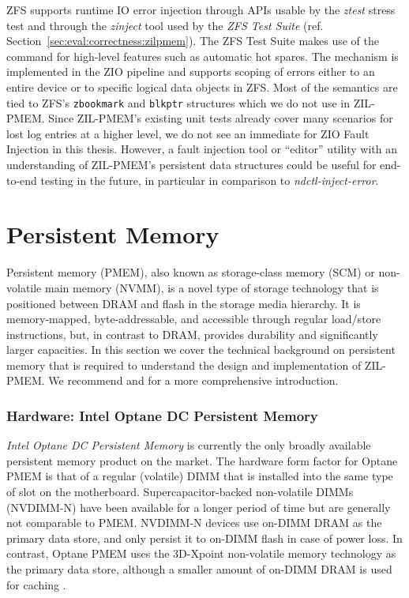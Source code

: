 \documentclass[12pt,a4paper,twoside]{book}
\begin{document}
ZFS supports runtime IO error injection through APIs usable by the \textit{ztest} stress test and through the \textit{zinject} tool used by the \textit{ZFS Test Suite} (ref. Section~\ref{sec:eval:correctness:zilpmem}).
The ZFS Test Suite makes use of the command for high-level features such as automatic hot spares.
The mechanism is implemented in the ZIO pipeline and supports scoping of errors either to an entire device or to specific logical data objects in ZFS.
Most of the semantics are tied to ZFS’s \lstinline{zbookmark} and \lstinline{blkptr} structures which we do not use in ZIL-PMEM.
Since ZIL-PMEM's existing unit tests already cover many scenarios for lost log entries at a higher level, we do not see an immediate for ZIO Fault Injection in this thesis.
However, a fault injection tool or ``editor'' utility with an understanding of ZIL-PMEM's persistent data structures could be useful for end-to-end testing in the future, in particular in comparison to \textit{ndctl-inject-error}.

\section{Persistent Memory}
Persistent memory (PMEM), also known as storage-class memory (SCM) or non-volatile main memory (NVMM), is a novel type of storage technology that is positioned between DRAM and flash in the storage media hierarchy.
It is memory-mapped, byte-addressable, and accessible through regular load/store instructions, but, in contrast to DRAM, provides durability and significantly larger capacities.
In this section we cover the technical background on persistent memory that is required to understand the design and implementation of ZIL-PMEM.
We recommend \cite{rudoffPersistentMemoryProgramming2017} and \cite{Scargall2020} for a more comprehensive introduction.

\subsubsection{Hardware: Intel Optane DC Persistent Memory}
\textit{Intel Optane DC Persistent Memory} is currently the only broadly available persistent memory product on the market.
The hardware form factor for Optane PMEM is that of a regular (volatile) DIMM that is installed into the same type of slot on the motherboard.
Supercapacitor-backed non-volatile DIMMs (NVDIMM-N) have been available for a longer period of time but are generally not comparable to PMEM.
NVDIMM-N devices use on-DIMM DRAM as the primary data store, and only persist it to on-DIMM flash in case of power loss.
In contrast, Optane PMEM uses the 3D-Xpoint non-volatile memory technology as the primary data store, although a smaller amount of on-DIMM DRAM is used for caching \cite{yangEmpiricalGuideBehavior2020}.
\end{document}

